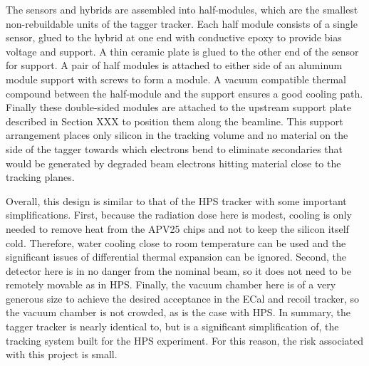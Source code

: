 The sensors and hybrids are assembled into half-modules, which are the smallest non-rebuildable units of the tagger tracker.  Each half module consists of a single sensor, glued to the hybrid at one end with conductive epoxy to provide bias voltage and support.  A thin ceramic plate is glued to the other end of the sensor for support.  A pair of half modules is attached to either side of an aluminum module support with screws to form a module.  A vacuum compatible thermal compound between the half-module and the support ensures a good cooling path. Finally these double-sided modules are attached to the upstream support plate described in Section XXX to position them along the beamline.
 This support arrangement places only silicon in the tracking volume and no material on the side of the tagger towards which electrons bend to eliminate secondaries that would be generated by degraded beam electrons hitting material close to the tracking planes.  

Overall, this design is similar to that of the HPS tracker with some important simplifications.  First, because the radiation dose here is modest, cooling is only needed to remove heat from the APV25 chips and not to keep the silicon itself cold.  Therefore, water cooling close to room temperature can be used and the significant issues of differential thermal expansion can be ignored.  Second, the detector here is in no danger from the nominal beam, so it does not need to be remotely movable as in HPS.  Finally, the vacuum chamber here is of a very generous size to achieve the desired acceptance in the ECal and recoil tracker, so the vacuum chamber is not crowded, as is the case with HPS.  In summary, the tagger tracker is nearly identical to, but is a significant simplification of, the tracking system built for the HPS experiment.  For this reason, the risk associated with this project is small.



